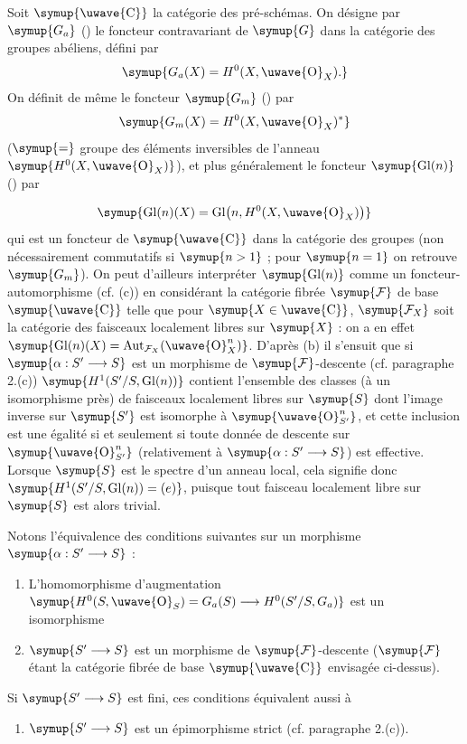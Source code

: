  Soit $\symup{\text{\uwave{C}}}$ la catégorie des pré-schémas. On désigne
par $\symup{G_a}$ () le foncteur contravariant de $\symup{G}$ dans
la catégorie des groupes abéliens, défini par
\[
  \symup{G_a(X)=H^0(X,\text{\uwave{O}}_X).}
\]
On définit de même le foncteur $\symup{G_m}$ () par
\[
  \symup{G_m(X)=H^0(X,\text{\uwave{O}}_X)^*}
\]
($\symup{=}$ groupe des éléments inversibles de l'anneau $\symup{H^0(X,\text{\uwave{O}}_X)}$), et plus
généralement le foncteur $\symup{\operatorname{Gl}(n)}$ () par

\[
  \symup{\operatorname{Gl}(n)(X)=
  \operatorname{Gl}\bigl(n,H^0(X,\text{\uwave{O}}_X)\bigr)}
\]
qui est un foncteur de $\symup{\text{\uwave{C}}}$ dans la catégorie des groupes (non
nécessairement commutatifs si $\symup{n>1}$ ; pour $\symup{n=1}$ on retrouve $\symup{G_m}$). On peut
d'ailleurs interpréter $\symup{\operatorname{Gl}(n)}$ comme un foncteur-automorphisme
(cf. (c)) en considérant la catégorie fibrée $\symup{\mathcal F}$ de base $\symup{\text{\uwave{C}}}$
telle que pour $\symup{X\in\text{\uwave{C}}}$, $\symup{\mathcal F_X}$ soit la catégorie des
faisceaux localement libres sur $\symup{X}$ : on a en effet $\symup{\operatorname{Gl}(n)(X)=\operatorname{Aut}_{\mathcal F_X}(\text{\uwave{O}}_X^n)}$.
D'après (b) il s'ensuit que si $\symup{\alpha:S'\longrightarrow S}$ est un morphisme
de $\symup{\mathcal F}$-descente (cf. paragraphe 2.(c)) $\symup{H^1(S'/S,\operatorname{Gl}(n))}$
contient l'ensemble des classes (à un isomorphisme près) de faisceaux localement
libres sur $\symup{S}$ dont l'image inverse sur $\symup{S'}$ est isomorphe à
$\symup{\text{\uwave{O}}_{S'}^n}$, et cette inclusion est une égalité si et seulement si
toute donnée de descente sur $\symup{\text{\uwave{O}}_{S'}^n}$ (relativement à
$\symup{\alpha:S'\longrightarrow S}$) est effective. Lorsque $\symup{S}$ est le spectre d'un
anneau local, cela signifie donc
$\symup{H^1(S'/S,\operatorname{Gl}(n))=(e)}$, puisque tout faisceau localement libre
sur $\symup{S}$ est alors trivial.

Notons l'équivalence des conditions suivantes sur un morphisme
$\symup{\alpha:S'\longrightarrow S}$ :
\begin{enumerate}
\item[\textnormal{(i).}] L'homomorphisme d'augmentation $\symup{H^0(S,\text{\uwave{O}}_S)=G_a(S)\longrightarrow H^0(S'/S,G_a)}$ est un isomorphisme
\item[\textnormal{(ii).}] $\symup{S'\longrightarrow S}$ est un morphisme de $\symup{\mathcal F}$-descente
($\symup{\mathcal F}$ étant la catégorie fibrée de base $\symup{\text{\uwave{C}}}$ envisagée
ci-dessus).
\end{enumerate}
Si $\symup{S'\longrightarrow S}$ est fini, ces conditions équivalent aussi à
\begin{enumerate}
\item[\textnormal{(iii).}] $\symup{S'\longrightarrow S}$ est un épimorphisme strict
(cf. paragraphe 2.(c)).
\end{enumerate}

